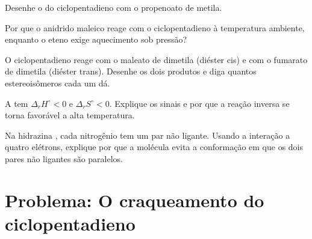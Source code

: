 \begin{exercise}[$\star\star$]\label{exo:b2:frontier-orbitals:8}
Desenhe o  do ciclopentadieno com o propenoato de metila.
\end{exercise}

\begin{exercise}[$\star\star$]\label{exo:b2:frontier-orbitals:9}
Por que o anidrido maleico reage com o ciclopentadieno à temperatura ambiente,
enquanto o eteno exige aquecimento sob pressão?
\end{exercise}

\begin{exercise}[$\star\star\star$]\label{exo:b2:frontier-orbitals:10}
O ciclopentadieno reage com o maleato de dimetila (diéster cis) e com o
fumarato de dimetila (diéster trans). Desenhe os dois produtos e diga quantos
estereoisômeros cada um dá.
\end{exercise}

\begin{exercise}[$\star\star\star$]\label{exo:b2:frontier-orbitals:11}
A  tem $\Delta_r H^\circ < 0$ e $\Delta_r S^\circ < 0$. Explique os
sinais e por que a reação inversa se torna favorável a alta temperatura.
\end{exercise}

\begin{exercise}[$\star\star\star$]\label{exo:b2:frontier-orbitals:12}
Na hidrazina , cada nitrogênio tem um par não ligante. Usando a
interação a quatro elétrons, explique por que a molécula evita a conformação
em que os dois pares não ligantes são paralelos.
\end{exercise}

\section{Problema: O craqueamento do ciclopentadieno}

